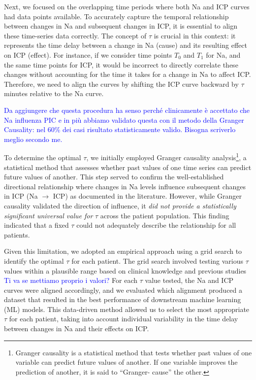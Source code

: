 Next, we focused on the overlapping time periods where both Na and ICP curves had data points available. To accurately capture the temporal relationship between changes in Na and subsequent changes in ICP, it is essential to align these time-series data correctly. The concept of $\tau$ is crucial in this context: it represents the time delay between a change in Na (cause) and its resulting effect on ICP (effect). For instance, if we consider time points $T_0$ and $T_1$ for Na, and the same time points for ICP, it would be incorrect to directly correlate these changes without accounting for the time it takes for a change in Na to affect ICP. Therefore, we need to align the curves by shifting the ICP curve backward by $\tau$ minutes relative to the Na curve.

\textcolor{blue}{Da aggiungere che questa procedura ha senso perché clinicamente è accettato che Na influenza PIC e in più abbiamo validato questa con il metodo della Granger Causality: nel 60\% dei casi risultato statisticamente valido. Bisogna scriverlo meglio secondo me.}

To determine the optimal $\tau$, we initially employed Granger causality analysis\footnote{Granger causality is a statistical method that tests whether past values of one variable can predict future values of another. If one variable improves the prediction of another, it is said to “Granger- cause” the other.}, a statistical method that assesses whether past values of one time series can predict future values of another. This step served to confirm the well-established directional relationship where changes in Na levels influence subsequent changes in ICP (Na $\rightarrow$ ICP) as documented in the literature. However, while Granger causality validated the direction of influence, it \textit{did not provide a statistically significant universal value for} $\tau$ across the patient population. This finding indicated that a fixed $\tau$ could not adequately describe the relationship for all patients.

Given this limitation, we adopted an empirical approach using a grid search to identify the optimal $\tau$ for each patient. The grid search involved testing various $\tau$ values within a plausible range based on clinical knowledge and previous studies \textcolor{blue}{Ti va se mettiamo proprio i valori?} For each $\tau$ value tested, the Na and ICP curves were aligned accordingly, and we evaluated which alignment produced a dataset that resulted in the best performance of downstream machine learning (ML) models. This data-driven method allowed us to select the most appropriate $\tau$ for each patient, taking into account individual variability in the time delay between changes in Na and their effects on ICP.

